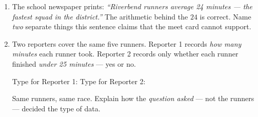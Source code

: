 \documentclass[10pt]{article}
\begin{document}
\boxguard
\begin{extensionbox}
\small
\begin{enumerate}[leftmargin=1.6em, itemsep=5pt, topsep=2pt]

  \item The school newspaper prints: \textit{``Riverbend runners average 24 minutes ---
        the fastest squad in the district.''} The arithmetic behind the $24$ is correct.
        Name \emph{two} separate things this sentence claims that the meet card cannot
        support.

  \item Two reporters cover the same five runners. Reporter 1 records \emph{how many
        minutes} each runner took. Reporter 2 records only whether each runner finished
        \emph{under 25 minutes} --- yes or no.

        Type for Reporter 1: \blank{3.2cm} \hfill
        Type for Reporter 2: \blank{3.2cm}

        Same runners, same race. Explain how the \emph{question asked} --- not the
        runners --- decided the type of data.
        \writeline

\end{enumerate}
\end{extensionbox}
\end{document}
